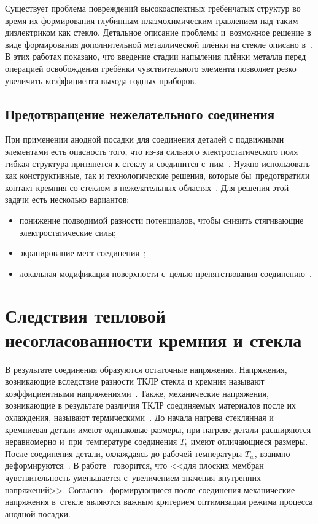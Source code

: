 Существует проблема повреждений высокоаспектных гребенчатых структур во время их формирования глубинным плазмохимическим травлением над таким диэлектриком как стекло. Детальное описание проблемы и~возможное решение в виде формирования дополнительной металлической плёнки на стекле описано в~\cite{LeeMC2005_gyro_siog}. В этих работах показано, что введение стадии напыления плёнки металла перед операцией освобождения гребёнки чувствительного элемента позволяет резко увеличить коэффициента выхода годных приборов.

\subsection{Предотвращение нежелательного соединения}\label{chap:unintentional_bond}
При применении анодной посадки для соединения деталей с подвижными
элементами есть опасность того, что из-за сильного электростатического
поля гибкая структура притянется к стеклу и соединится
с~ним~\cite{Cozma_Puers_1995}. Нужно использовать как конструктивные,
так и технологические решения, которые бы~предотвратили контакт
кремния со стеклом в нежелательных
областях~\cite{Yu2008_Yield_improvement_AB}.
Для решения этой задачи есть несколько вариантов:
\begin{itemize}
    \item понижение подводимой разности потенциалов, чтобы снизить стягивающие электростатические силы;
    \item экранирование мест соединения~\cite{lit_Esashi_Wafer2008};
    \item локальная модификация поверхности с~целью препятствования соединению~\cites[6]{ushkov2008_avtoref}.
\end{itemize}

\section{Следствия тепловой несогласованности кремния и стекла}\label{chap_temp_inconsistence}
В результате соединения образуются остаточные напряжения.
Напряжения, возникающие вследствие разности ТКЛР стекла и кремния называют
коэффициентными напряжениями~\cite{ost_Steklo_terminy}. Также, механические
напряжения, возникающие в результате различия ТКЛР соединяемых материалов после
их охлаждения, называют термическими~\cites[С.~19, 26]{mehan_napr_plenki1981obzor}.
До начала нагрева стеклянная и кремниевая детали имеют одинаковые размеры, при
нагреве детали расширяются неравномерно и~при~температуре соединения $T_b$ имеют
отличающиеся размеры. После соединения детали, охлаждаясь до рабочей температуры
$T_w$, взаимно деформируются~\cite{Sinev_Ryabov_rasch_coef_napr_nmst2014}.
В работе~\cites[13]{matuzov2008_avtoref} говорится, что <<для плоских
мембран чувствительность уменьшается с~увеличением значения внутренних
напряжений>>.
Cогласно~\cite{Cozma_Puers_1995} формирующиеся после
соединения механические напряжения в~стекле являются важным критерием
оптимизации режима процесса анодной посадки.

